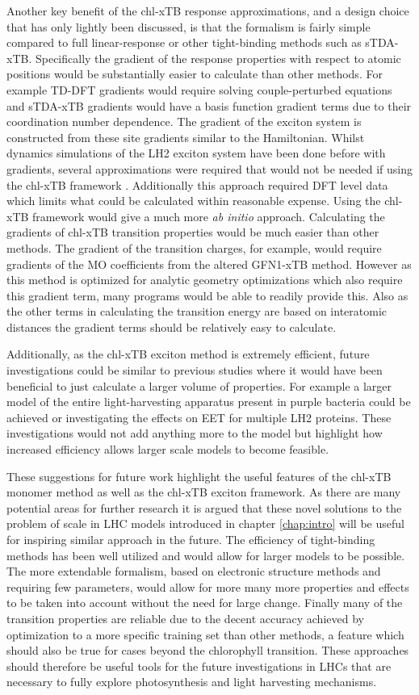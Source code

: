 Another key benefit of the chl-xTB response approximations, and a design choice 
that has only lightly been discussed, is that the formalism is fairly simple compared 
to full linear-response or other tight-binding methods such as sTDA-xTB. Specifically
the gradient of the response properties with respect to atomic positions would be
substantially easier to calculate than other methods. For example TD-DFT gradients 
would require solving couple-perturbed equations and sTDA-xTB gradients would have 
a basis function gradient terms due to their coordination number dependence. The gradient
of the exciton system is constructed from these site gradients similar to the Hamiltonian.
Whilst dynamics simulations of the LH2 exciton system have been done before with
gradients, several approximations were required that would not be needed if using
the chl-xTB framework \cite{Sisto2017}. Additionally this approach required DFT 
level data which limits what could be calculated within reasonable expense. Using 
the chl-xTB framework would give a much more \emph{ab initio} approach. Calculating 
the gradients of chl-xTB transition properties would be much easier than other methods.
The gradient of the transition charges, for example, would require gradients of 
the MO coefficients from the altered GFN1-xTB method. However as this method is 
optimized for analytic geometry optimizations which also require this gradient term,
many programs would be able to readily provide this. Also as the other terms in 
calculating the transition energy are based on interatomic distances the gradient 
terms should be relatively easy to calculate.

Additionally, as the chl-xTB exciton method is extremely efficient, future investigations
could be similar to previous studies where it would have been beneficial to just 
calculate a larger volume of properties. For example a larger model of the entire
light-harvesting apparatus present in purple bacteria could be achieved or investigating
the effects on EET for multiple LH2 proteins. These investigations would not add
anything more to the model but highlight how increased efficiency allows larger
scale models to become feasible.

These suggestions for future work highlight the useful features of the chl-xTB monomer
method as well as the chl-xTB exciton framework. As there are many potential areas
for further research it is argued that these novel solutions to the problem of scale
in LHC models introduced in chapter \ref{chap:intro} will be useful for inspiring
similar approach in the future. The efficiency of tight-binding methods has been
well utilized and would allow for larger models to be possible. The more extendable
formalism, based on electronic structure methods and requiring few parameters, would
allow for more many more properties and effects to be taken into account without 
the need for large change. Finally many of the transition properties are reliable
due to the decent accuracy achieved by optimization to a more specific training 
set than other methods, a feature which should also be true for cases beyond the
\Qy chlorophyll transition. These approaches should therefore be useful tools for
the future investigations in LHCs that are necessary to fully explore photosynthesis
and light harvesting mechanisms. 